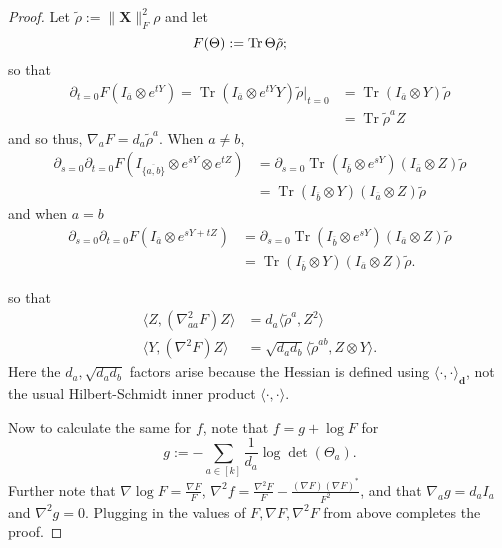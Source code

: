 \documentclass{article}
\renewcommand{\vec}{\bm}
\newcommand\tr{\operatorname{Tr}}
\begin{document}
\begin{proof}
Let $\tilde{\rho}:= \|\vec X\|_F^2\rho$ and let
\[ F(\Theta) := \tr  \Theta \tilde{\rho}; \hspace{10mm} \]
so that 
\begin{align*} \partial_{t=0} F(I_{\overline{a}} \otimes e^{tY}) = \tr  (I_{\overline{a}} \otimes e^{tY}  Y)\tilde{\rho}  |_{t=0} &= \tr  (I_{\overline{a}} \otimes Y) \tilde{\rho} \\
&=\tr \tilde{\rho}^a  Z
 \end{align*}
 and so thus, $\nabla_a F = d_a \tilde{\rho}^a$.
When $a\neq b$,
\begin{align*}\partial_{s=0} \partial_{t=0} F(I_{\overline{\{a,b\}}} \otimes e^{sY} \otimes e^{tZ}) &=  \partial_{s=0} \tr  (I_{\overline{b}} \otimes e^{sY}) (I_{\overline{a}} \otimes Z) \tilde{\rho} \\
&= \tr (I_{\overline{b}} \otimes Y) (I_{\overline{a}} \otimes Z) \tilde{\rho}
\end{align*}
and when $a = b$ 
\begin{align*}\partial_{s=0} \partial_{t=0} F(I_{\overline{a}} \otimes e^{sY+ tZ}) &=  \partial_{s=0} \tr  (I_{\overline{b}} \otimes e^{sY}) (I_{\overline{a}} \otimes Z) \tilde{\rho} \\
&= \tr (I_{\overline{b}} \otimes Y) (I_{\overline{a}} \otimes Z) \tilde{\rho}.
\end{align*}

so that
\begin{align*} \langle Z, (\nabla^{2}_{aa} F) Z \rangle &= d_a \langle  \tilde{\rho}^a, Z^{2}\rangle   \\
 \langle Y, (\nabla^{2} F) Z \rangle &= \sqrt{d_a d_b}\langle \tilde{\rho}^{ab} , Z \otimes Y \rangle . \end{align*}
Here the $d_a, \sqrt{d_a d_b}$ factors arise because the Hessian is defined using $\langle \cdot, \cdot \rangle_{\vec d}$, not the usual Hilbert-Schmidt inner product $\langle \cdot, \cdot \rangle$.

Now to calculate the same for $f$, note that $f = g + \log F $ for 
$$g:= - \sum_{a \in [k]} \frac1{d_a} \log\det(\Theta_a).$$ Further note that $\nabla \log F = \frac{\nabla F}{F}$, $\nabla^{2} f = \frac{\nabla^{2} F}{F} - \frac{(\nabla F)(\nabla F)^{*}}{F^{2}}$, and that $\nabla_a g = d_a I_{a}$ and $\nabla^2 g = 0$. Plugging in the values of $F, \nabla F, \nabla^2 F$ from above completes the proof. \end{proof}
\end{document}
